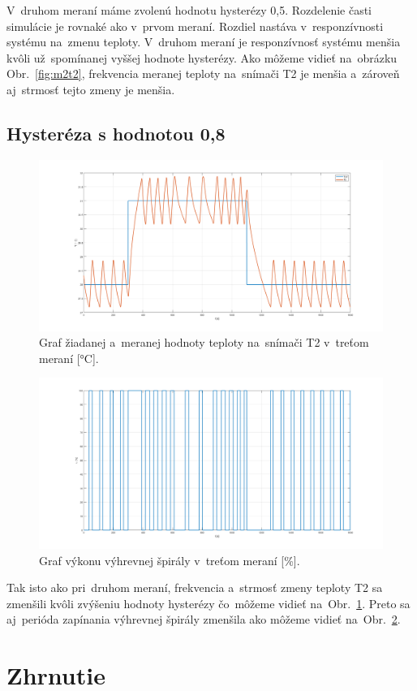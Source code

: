 \documentclass{article}
\begin{document}
V~druhom meraní máme zvolenú hodnotu hysterézy 0,5. Rozdelenie časti simulácie je rovnaké ako v~prvom meraní.
Rozdiel nastáva v~responzívnosti systému na~zmenu teploty. V~druhom meraní je responzívnosť systému menšia
kvôli už~spomínanej vyššej hodnote hysterézy. Ako môžeme vidieť na~obrázku Obr.~\ref{fig:m2t2}, frekvencia
meranej teploty na~snímači T2 je menšia a~zároveň aj~strmosť tejto zmeny je menšia.

\subsection{Hysteréza s hodnotou 0,8}
\label{sec:meranie3}

\begin{figure}[!htbp]
	\begin{center}
		\includegraphics[width=\textwidth]{./include/m3T2.png}
	\end{center}
	\caption{Graf žiadanej a~meranej hodnoty teploty na~snímači T2 v~treťom meraní [°C].}
	\label{fig:m3t2}
\end{figure}

\clearpage

\begin{figure}[!htbp]
	\begin{center}
		\includegraphics[width=\textwidth]{./include/m3u.png}
	\end{center}
	\caption{Graf výkonu výhrevnej špirály v~treťom meraní [\%].}
	\label{fig:m3u}
\end{figure}

Tak isto ako pri~druhom meraní, frekvencia a~strmosť zmeny teploty T2 sa zmenšili kvôli zvýšeniu hodnoty hysterézy
čo~môžeme vidieť na~Obr.~\ref{fig:m3t2}. Preto sa aj~perióda zapínania výhrevnej špirály zmenšila ako môžeme vidieť
na~Obr.~\ref{fig:m3u}.

\section{Zhrnutie}
\label{sec:zhrnutie}
\end{document}
